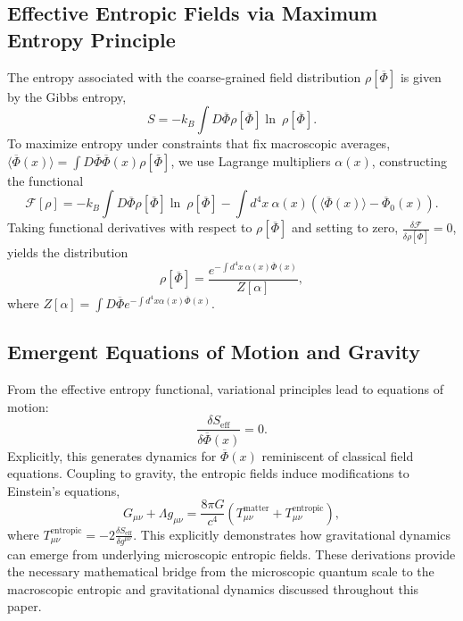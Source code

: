\documentclass[12pt, a4paper]{article}
\begin{document}
\subsection{Effective Entropic Fields via Maximum Entropy Principle}
The entropy associated with the coarse-grained field distribution $\rho[\overline{\Phi}]$ is given by the Gibbs entropy,
\begin{equation}
S=-k_{B}\int D\overline{\Phi}\rho[\overline{\Phi}]\ln~\rho[\overline{\Phi}].
\end{equation}
To maximize entropy under constraints that fix macroscopic averages, $\langle\overline{\Phi}(x)\rangle=\int D\overline{\Phi}\overline{\Phi}(x)\rho[\overline{\Phi}]$, we use Lagrange multipliers $\alpha(x)$, constructing the functional
\begin{equation}
\mathcal{F}[\rho]=-k_{B}\int D\overline{\Phi}\rho[\overline{\Phi}]\ln~\rho[\overline{\Phi}]-\int d^4x~\alpha(x)(\langle\overline{\Phi}(x)\rangle-\overline{\Phi}_{0}(x)).
\end{equation}
Taking functional derivatives with respect to $\rho[\overline{\Phi}]$ and setting to zero, $\frac{\delta\mathcal{F}}{\delta\rho[\overline{\Phi}]}=0$, yields the distribution
\begin{equation}
\rho[\overline{\Phi}]=\frac{e^{-\int d^4x~\alpha(x)\overline{\Phi}(x)}}{Z[\alpha]},
\end{equation}
where $Z[\alpha]=\int D\overline{\Phi}e^{-\int d^4x \alpha(x)\overline{\Phi}(x)}$.
\subsection{Emergent Equations of Motion and Gravity}
From the effective entropy functional, variational principles lead to equations of motion:
\begin{equation}
\frac{\delta S_{\text{eff}}}{\delta\overline{\Phi}(x)}=0.
\end{equation}
Explicitly, this generates dynamics for $\overline{\Phi}(x)$ reminiscent of classical field equations.
Coupling to gravity, the entropic fields induce modifications to Einstein's equations,
\begin{equation}
G_{\mu\nu}+\Lambda g_{\mu\nu}=\frac{8\pi G}{c^{4}}(T_{\mu\nu}^{\text{matter}}+T_{\mu\nu}^{\text{entropic}}),
\end{equation}
where $T_{\mu\nu}^{\text{entropic}}=-2\frac{\delta S_{\text{eff}}}{\delta g^{\mu\nu}}$.
This explicitly demonstrates how gravitational dynamics can emerge from underlying microscopic entropic fields.
These derivations provide the necessary mathematical bridge from the microscopic quantum scale to the macroscopic entropic and gravitational dynamics discussed throughout this paper.
\end{document}
